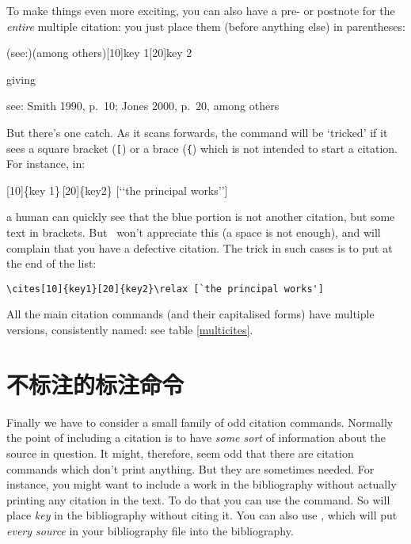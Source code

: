 To make things even more exciting, you can also have a pre- or
postnote for the \emph{entire} multiple citation: you just place them
(before anything else) in parentheses:
\begin{center}
\ttfamily
{}(see:)(among others)[10]{key 1}[20]{key 2}
\end{center}
giving
\begin{center}
see: Smith 1990, p.\ 10; Jones 2000, p.\ 20, among others
\end{center}

But there's one catch. As it scans forwards, the  command will
be `tricked' if it sees a square bracket (\texttt[) or a brace
(\texttt\{) which is not intended to start a citation. For instance,
in:
\begin{center}
\ttfamily
{}\colorbox{red!30}{[10]\{key
  1\}}\,\colorbox{green!30}{[20]\{key2\}}
\colorbox{blue!30}{[`{}`the principal works'{}']}
\end{center}
a human can quickly see that the blue portion is not another
citation, but some text in brackets. But \biblatex\ won't appreciate
this (a space is not enough), and will complain that you have a
defective citation. The trick in such cases is to put  at
the end of the list:
\begin{center}
\verb|\cites[10]{key1}[20]{key2}\relax [`the principal works']|
\end{center}

All the main citation commands (and their capitalised forms) have
multiple versions, consistently named: see table \ref{multicites}.

\section{不标注的标注命令}

Finally we have to consider a small family of odd citation
commands. Normally the point of including a citation is to have
\emph{some sort} of information about the source in question. It
might, therefore, seem odd that there are citation commands which
don't print anything. But they are sometimes needed. For instance, you
might want to include a work in the bibliography without actually
printing any citation in the text. To do that you can use the 
command. So  will place \emph{key} in the
bibliography without citing it. You can also use ,
which will put \emph{every source} in your bibliography file into the
bibliography.

